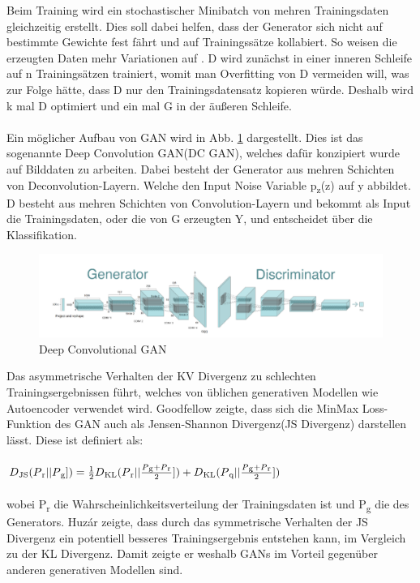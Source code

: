 \documentclass{llncs}
\begin{document}
Beim Training wird ein stochastischer Minibatch von mehren Trainingsdaten gleichzeitig erstellt. Dies soll dabei helfen, dass der Generator sich nicht auf bestimmte Gewichte fest fährt und auf Trainingssätze kollabiert. So weisen die erzeugten Daten mehr Variationen auf \cite{improvingan}. D wird zunächst in einer inneren Schleife auf n Trainingsätzen trainiert, womit man Overfitting von D vermeiden will, was zur Folge hätte, dass D nur den Trainingsdatensatz kopieren würde. Deshalb wird k mal D optimiert und ein mal G in der äußeren Schleife. 
\\\\
Ein möglicher Aufbau von GAN wird in Abb. \ref{fig:Bild21} dargestellt. Dies ist das sogenannte Deep Convolution GAN(DC GAN), welches dafür konzipiert wurde auf Bilddaten zu arbeiten. Dabei besteht der Generator aus mehren Schichten von Deconvolution-Layern. Welche den Input Noise Variable p\textsubscript{z}(z) auf y abbildet. D besteht aus mehren Schichten von Convolution-Layern und bekommt als Input die Trainingsdaten, oder die von G erzeugten Y, und entscheidet über die Klassifikation\cite{dcgan}.
\begin{figure}[htbp] 
	\centering
	\includegraphics[width=1.0\textwidth]{dcgan1.png}
	\caption{Deep Convolutional GAN\protect\cite{dc-gan_book}}
	\label{fig:Bild21}
\end{figure}
Das asymmetrische Verhalten der KV Divergenz zu schlechten Trainingsergebnissen führt, welches von üblichen generativen Modellen wie Autoencoder verwendet wird. Goodfellow \cite{goodfellow2014} zeigte, dass sich die MinMax Loss-Funktion des GAN auch als Jensen-Shannon Divergenz(JS Divergenz) darstellen lässt. Diese ist definiert als:
\\\\
\begin{math} D\textsubscript{JS}(P\textsubscript{r}|| P\textsubscript{g}])=\frac{1}{2}D\textsubscript{KL}(P\textsubscript{r}|| \frac{P\textsubscript{g}+P\textsubscript{r}}{2}])+D\textsubscript{KL}(P\textsubscript{q}|| \frac{P\textsubscript{g}+P\textsubscript{r}}{2}])  
\end{math}
\\\\
wobei P\textsubscript{r} die Wahrscheinlichkeitsverteilung der Trainingsdaten ist und P\textsubscript{g} die des Generators. Huzár \cite{sha} zeigte, dass durch das symmetrische Verhalten der JS Divergenz ein potentiell besseres Trainingsergebnis entstehen kann, im Vergleich zu der KL Divergenz. Damit zeigte er weshalb GANs im Vorteil gegenüber anderen generativen Modellen sind.
\newpage
\end{document}
